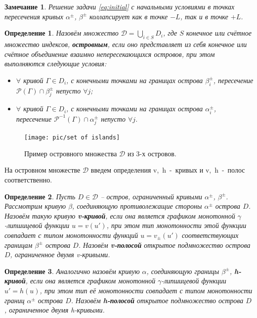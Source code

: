 \documentclass{article}
\newtheorem*{definition}{Определение}
\newtheorem{remark}{Замечание}
\begin{document}
\begin{remark}
 	Решение задачи \eqref{eq:initial} с начальными условиями в точках пересечения кривых $\alpha^{\pm}$, $\beta^{\pm}$ коллапсирует как в точке $-L$, так и в точке $+L$.
\label{rem:alpha-beta-intersection}
\end{remark}

\begin{definition}
	Назовём множество $\mathcal{D} = \bigcup_{i \in S} D_i$, где $S$ конечное или счётное множество индексов, {\bf островным}, если оно представляет из себя конечное или счётное объединение взаимно непересекающихся островов, при этом выполняются следующие условия:
		\begin{itemize}
			\item[(а)] $\forall$ кривой $\Gamma \in D_i$, с конечными точками на границах острова $\beta_i^{\pm}$, пересечение $\mathcal{P} (\Gamma) \cap \beta_j^{\pm}$ непусто $\forall j$;
			\item[(б)] $\forall$ кривой $\Gamma \in D_i$, с конечными точками на границах острова $\alpha_i^{\pm}$, пересечение $\mathcal{P}^{-1} (\Gamma) \cap \alpha_j^{\pm}$ непусто $\forall j$.
		\end{itemize}
\end{definition}

\begin{figure}[h]
\centering
  \texttt{[image: pic/set of islands]}
  \caption{Пример островного множества $\mathcal{D}$ из 3-х островов.}
\label{fig:islands}
\end{figure}

На островном множестве $\mathcal{D}$ введем определения v,~h~-~кривых и v,~h~-~полос соответственно.

\begin{definition}
	Пусть $D \in \mathcal{D}$ -- остров, ограниченный кривыми $\alpha^{\pm}$, $\beta^{\pm}$.
	Рассмотрим кривую $\beta$, соединяющую противолежащие стороны $\alpha^{\pm}$ острова $D$.
	Назовём такую кривую {\bf v-кривой}, если она является графиком монотонной $\gamma$-липшицевой функции $u = v(u')$, при этом тип монотонности этой функции совпадает с типом монотонности функций $u = v_{\pm}(u')$ соответствующих границам $\beta^{\pm}$ острова $D$.
	Назовём {\bf v-полосой} открытое подмножество острова $D$, ограниченное двумя \emph{v}-кривыми.
\end{definition}

\begin{definition}
	Аналогично назовём кривую $\alpha$, соединяющую границы $\beta^{\pm}$, {\bf h-кривой}, если она является графиком монотонной $\gamma$-липшицевой функции $u' = h(u)$, при этом тип её монотонности совпадает с типом монотонности границ $\alpha^{\pm}$ острова $D$.
	Назовём {\bf h-полосой} открытое подмножество острова $D$, ограниченное двумя \emph{h}-кривыми.
\end{definition}
\end{document}
